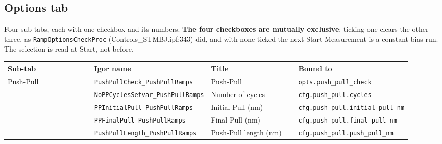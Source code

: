 \subsection{Options tab}

Four sub-tabs, each with one checkbox and its numbers. \textbf{The four checkboxes are mutually exclusive}: ticking one clears the other three, as \texttt{Ramp\discretionary{}{}{}Options\discretionary{}{}{}Check\discretionary{}{}{}Proc} (Controls\_STMBJ.ipf:343) did, and with none ticked the next Start Measurement is a constant-bias run. The selection is read at Start, not before.

\small\setlength{\LTleft}{0pt}\setlength{\LTright}{\fill}
\begin{longtable}{@{}>{\raggedright\arraybackslash}p{0.230\linewidth}>{\raggedright\arraybackslash}p{0.230\linewidth}>{\raggedright\arraybackslash}p{0.230\linewidth}>{\raggedright\arraybackslash}p{0.230\linewidth}@{}}
\toprule
\textbf{Sub-tab} & \textbf{Igor name} & \textbf{Title} & \textbf{Bound to} \\
\midrule\endhead
Push-Pull & \texttt{Push\discretionary{}{}{}Pull\discretionary{}{}{}Check\_\discretionary{}{}{}Push\discretionary{}{}{}Pull\discretionary{}{}{}Ramps} & Push-Pull & \texttt{opts.\discretionary{}{}{}push\_\discretionary{}{}{}pull\_\discretionary{}{}{}check} \\
 & \texttt{No\discretionary{}{}{}PPCycles\discretionary{}{}{}Setvar\_\discretionary{}{}{}Push\discretionary{}{}{}Pull\discretionary{}{}{}Ramps} & Number of cycles & \texttt{cfg.\discretionary{}{}{}push\_\discretionary{}{}{}pull.\discretionary{}{}{}cycles} \\
 & \texttt{PPInitial\discretionary{}{}{}Pull\_\discretionary{}{}{}Push\discretionary{}{}{}Pull\discretionary{}{}{}Ramps} & Initial Pull (nm) & \texttt{cfg.\discretionary{}{}{}push\_\discretionary{}{}{}pull.\discretionary{}{}{}initial\_\discretionary{}{}{}pull\_\discretionary{}{}{}nm} \\
 & \texttt{PPFinal\discretionary{}{}{}Pull\_\discretionary{}{}{}Push\discretionary{}{}{}Pull\discretionary{}{}{}Ramps} & Final Pull (nm) & \texttt{cfg.\discretionary{}{}{}push\_\discretionary{}{}{}pull.\discretionary{}{}{}final\_\discretionary{}{}{}pull\_\discretionary{}{}{}nm} \\
 & \texttt{Push\discretionary{}{}{}Pull\discretionary{}{}{}Length\_\discretionary{}{}{}Push\discretionary{}{}{}Pull\discretionary{}{}{}Ramps} & Push-Pull length (nm) & \texttt{cfg.\discretionary{}{}{}push\_\discretionary{}{}{}pull.\discretionary{}{}{}push\_\discretionary{}{}{}pull\_\discretionary{}{}{}nm} \\

\end{longtable}

